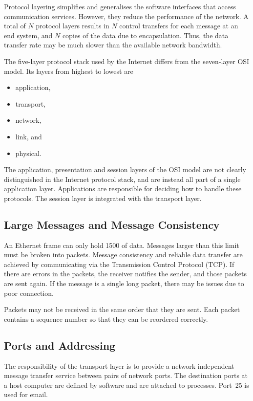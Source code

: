 Protocol layering simplifies and generalises the software interfaces that access communication services.
However, they reduce the performance of the network.
A total of \(N\) protocol layers results in \(N\) control transfers for each message at an end system, and \(N\) copies of the data due to encapsulation.
Thus, the data transfer rate may be much slower than the available network bandwidth.

The five-layer protocol stack used by the Internet differs from the seven-layer OSI model.
Its layers from highest to lowest are
\begin{itemize}
  \item application,
  \item transport,
  \item network,
  \item link, and
  \item physical.
\end{itemize}
The application, presentation and session layers of the OSI model are not clearly distinguished in the Internet protocol stack, and are instead all part of a single application layer.
Applications are responsible for deciding how to handle these protocols.
The session layer is integrated with the transport layer.

\subsection{Large Messages and Message Consistency}

An Ethernet frame can only hold \SI{1500}{\byte} of data.
Messages larger than this limit must be broken into packets.
Message consistency and reliable data transfer are achieved by communicating via the Transmission Control Protocol (TCP).
If there are errors in the packets, the receiver notifies the sender, and those packets are sent again.
If the message is a single long packet, there may be issues due to poor connection.

Packets may not be received in the same order that they are sent.
Each packet contains a sequence number so that they can be reordered correctly.

\subsection{Ports and Addressing}

The responsibility of the transport layer is to provide a network-independent message transfer service between pairs of network ports.
The destination ports at a host computer are defined by software and are attached to processes.
Port~\num{25} is used for email.

